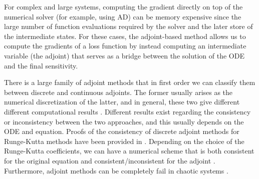 For complex and large systems, computing the gradient directly on top of the numerical solver (for example, using AD) can be memory expensive since the large number of function evaluations required by the solver and the later store of the intermediate states. 
For these cases, the adjoint-based method allows us to compute the gradients of a loss function by instead computing an intermediate variable (the adjoint) that serves as a bridge between the solution of the ODE and the final sensitivity. 

There is a large family of adjoint methods that in first order we can classify them between discrete and continuous adjoints. 
The former usually arises as the numerical discretization of the latter, and in general, these two give different different computational results \cite{Sirkes_Tziperman_1997}.
Different results exist regarding the consistency or inconsistency between the two approaches, and this usually depends on the ODE and equation.  
Proofs of the consistency of discrete adjoint methods for Runge-Kutta methods have been provided in \cite{sandu2006properties, sandu2011solution}.
Depending on the choice of the Runge-Kutta coefficients, we can have a numerical scheme that is both consistent for the original equation and consistent/inconsistent for the adjoint \cite{Hager_2000}.
Furthermore, adjoint methods can be completely fail in chaotic systems \cite{Wang2012-chaos-adjoint}.